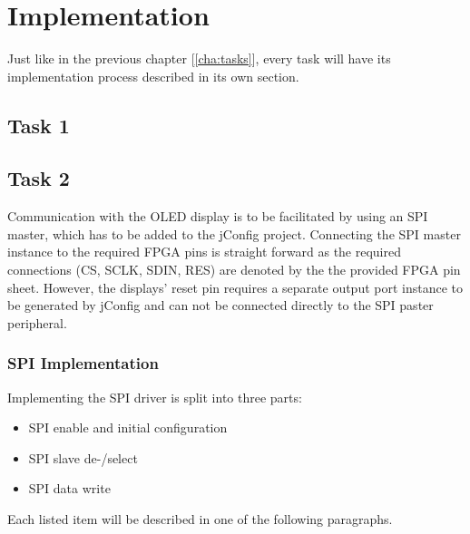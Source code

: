 \chapter{Implementation} %
\label{cha:impl}
	Just like in the previous chapter [\ref{cha:tasks}], every task will have its implementation process described in its own section.

	\section{Task 1} %
	\label{sec:impl_task_1}
		

	\section{Task 2} %
	\label{sec:impl_task_2}
		Communication with the OLED display is to be facilitated by using an SPI master, which has to be added to the jConfig project. Connecting the SPI master instance to the required FPGA pins is straight forward as the required connections (CS, SCLK, SDIN, RES) are denoted by the the provided FPGA pin sheet. However, the displays' reset pin requires a separate output port instance to be generated by jConfig and can not be connected directly to the SPI paster peripheral. 

		\subsection{SPI Implementation} %
		\label{sub:impl_spi_implementation}
			Implementing the SPI driver is split into three parts:

			\begin{itemize}
				\item SPI enable and initial configuration
				\item SPI slave de-/select
				\item SPI data write
	   		\end{itemize}

	   		Each listed item will be described in one of the following paragraphs.

